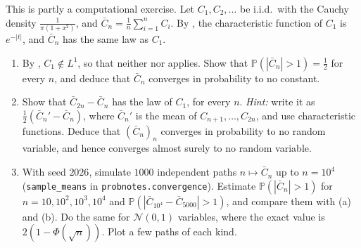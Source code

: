 \begin{exercise}\label{ex:ll-cauchy}
\hard This is partly a computational exercise. Let $C_1,C_2,\dots$ be i.i.d.\ with the Cauchy
density $\frac1{\pi(1+x^2)}$, and $\bar C_n=\frac1n\sum_{i=1}^nC_i$. By , the
characteristic function of $C_1$ is $e^{-|t|}$, and $\bar C_n$ has the same law as $C_1$.
\begin{enumerate}[label=(\alph*)]
  \item By , $C_1\notin L^1$, so that neither  nor
     applies. Show that $\mathbb P(|\bar C_n|>1)=\frac12$ for every
    $n$, and deduce that $\bar C_n$ converges in probability to no constant.
  \item Show that $\bar C_{2n}-\bar C_n$ has the law of $C_1$, for every $n$. \emph{Hint:} write it
    as $\frac12(\bar C_n'-\bar C_n)$, where $\bar C_n'$ is the mean of $C_{n+1},\dots,C_{2n}$, and
    use characteristic functions. Deduce that $(\bar C_n)_n$ converges in probability to no random
    variable, and hence converges almost surely to no random variable.
  \item With seed $2026$, simulate $1000$ independent paths $n\mapsto\bar C_n$ up to $n=10^4$
    (\texttt{sample\_means} in \texttt{probnotes.convergence}). Estimate
    $\mathbb P(|\bar C_n|>1)$ for $n=10,10^2,10^3,10^4$ and $\mathbb P(|\bar C_{10^4}-\bar
    C_{5000}|>1)$, and compare them with (a) and (b). Do the same for $\mathcal N(0,1)$ variables,
    where the exact value is $2(1-\Phi(\sqrt n))$. Plot a few paths of each kind.
\end{enumerate}
\end{exercise}

